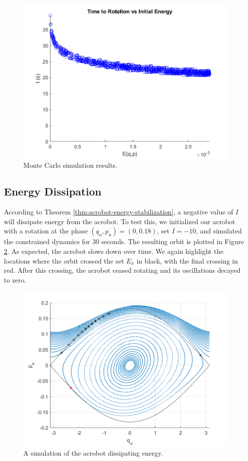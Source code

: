 \documentclass[journal,twoside,web]{ieeecolor}
\begin{document}
\begin{figure}[]
    \centering
    \includegraphics[width=0.8\linewidth]{acrobot_mc.png}
    \caption{Monte Carlo simulation results.}
    \label{fig:acrobot-mc}
\end{figure}

\subsection{Energy Dissipation}

According to Theorem \ref{thm:acrobot-energy-stabilization}, a negative value
of \(I\) will dissipate energy from the acrobot.
To test this, we initialized our acrobot with a rotation at the phase
\((q_u,p_u) = (0,0.18)\),  set \(I = -10\), and simulated the constrained
dynamics for \(30\) seconds.
The resulting orbit is plotted in Figure \ref{fig:acrobot-diss-orbit}. 
As expected, the acrobot slows down over time.
We again highlight the locations where the orbit crossed the set \(E_\pi\) in
black, with the final crossing in red. 
After this crossing, the acrobot ceased rotating and its oscillations decayed to
zero.

\begin{figure}
    \centering
    \includegraphics[width=0.8\linewidth]{acrobot_diss_orbit.png}
    \caption{A simulation of the acrobot dissipating energy.}
    \label{fig:acrobot-diss-orbit}
\end{figure}
\end{document}
